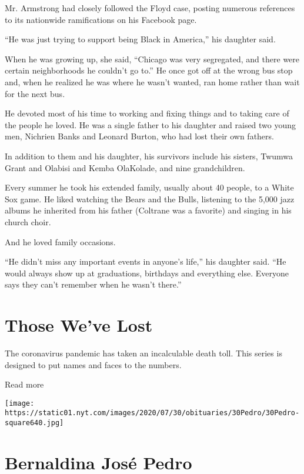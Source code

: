 Mr. Armstrong had closely followed the Floyd case, posting numerous
references to its nationwide ramifications on his Facebook page.

``He was just trying to support being Black in America,'' his daughter
said.

When he was growing up, she said, ``Chicago was very segregated, and
there were certain neighborhoods he couldn't go to.'' He once got off at
the wrong bus stop and, when he realized he was where he wasn't wanted,
ran home rather than wait for the next bus.

He devoted most of his time to working and fixing things and to taking
care of the people he loved. He was a single father to his daughter and
raised two young men, Nichrien Banks and Leonard Burton, who had lost
their own fathers.

In addition to them and his daughter, his survivors include his sisters,
Twumwa Grant and Olabisi and Kemba OlaKolade, and nine grandchildren.

Every summer he took his extended family, usually about 40 people, to a
White Sox game. He liked watching the Bears and the Bulls, listening to
the 5,000 jazz albums he inherited from his father (Coltrane was a
favorite) and singing in his church choir.

And he loved family occasions.

``He didn't miss any important events in anyone's life,'' his daughter
said. ``He would always show up at graduations, birthdays and everything
else. Everyone says they can't remember when he wasn't there.''

\href{https://www.nytimes.com/interactive/2020/obituaries/people-died-coronavirus-obituaries.html?action=click\&pgtype=Article\&state=default\&region=BELOW_MAIN_CONTENT\&context=covid_obits_promo}{}

\hypertarget{those-weve-lost}{%
\section{Those We've Lost}\label{those-weve-lost}}

The coronavirus pandemic has taken an incalculable death toll. This
series is designed to put names and faces to the numbers.

Read more

\texttt{[image: https://static01.nyt.com/images/2020/07/30/obituaries/30Pedro/30Pedro-square640.jpg]}

\hypertarget{bernaldina-josuxe9-pedro}{%
\section{Bernaldina José Pedro}\label{bernaldina-josuxe9-pedro}}


